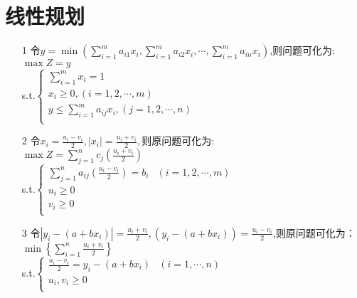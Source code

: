 \documentclass[a4paper,20pt]{article}
\begin{document}
\section{线性规划}
\begin{itemize}
    \item[1] 令$y=\min(\sum_{i=1}^{m}a_{i1}x_i,\sum_{i=1}^{m}a_{i2}x_i,\cdots,\sum_{i=1}^{m}a_{in}x_i)$,则问题可化为:
    \\$\max Z=y$ 
    \\s.t.$ \left\{\begin{matrix}
        \sum_{i=1}^{m}x_i=1\\
        x_i\geq 0,(i=1,2,\cdots,m)\\
        y \leq \sum_{i=1}^{m}a_{ij}x_i,(j=1,2,\cdots,n)\\
    \end{matrix}\right.$
    \item[2] 令$x_i=\frac{u_i-v_i}{2},|x_i|=\frac{u_i+v_i}{2},$则原问题可化为:
    \\$\max Z=\sum_{j=1}^{n}c_{j}(\frac{u_i+v_i}{2})$
    \\s.t.$\left\{
        \begin{matrix}
            \sum_{j=1}^{n}a_{ij}(\frac{u_i-v_i}{2})=b_i&(i=1,2,\cdots,m)\\
            u_i\geq 0\\
            v_i\geq 0\\
        \end{matrix}
    \right.$
        \item[3] 令$|y_i-(a+bx_i)|=\frac{u_i+v_i}{2},(y_i-(a+bx_i))=\frac{u_i-v_i}{2}$,则原问题可化为：
        \\$\min \left\{ \sum_{i=1}^{n}\frac{u_i+v_i}{2} \right\}$
        \\s.t.$\left\{\begin{matrix}
            \frac{u_i-v_i}{2}=y_i-(a+bx_i)&(i=1,\cdots,n)\\
            u_i,v_i\geq 0\\
        \end{matrix}\right.$


\end{itemize}
\end{document}
